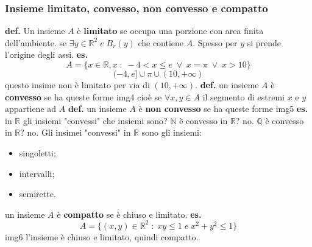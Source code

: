 \subsubsection*{Insieme limitato, convesso, non convesso e compatto}
\textbf{def.} Un insieme $A$ è \textbf{limitato} se occupa una porzione con area finita dell'ambiente.
\newline
se $\exists y \in \mathbb{R}^2 \;e\; B_r(y)$ che contiene $A$. Spesso per $y$ si prende l'origine degli assi.
\newline
\textbf{es.} 
\[
    A = \{x \in \mathbb{R}, x \;:\; -4 < x \leq e \;\lor\; x = \pi \;\lor\; x > 10\}
\]
\[
    (-4,e] \cup {\pi} \cup (10, +\infty)
\]
questo insime non è limitato per via di $(10, +\infty)$.
\newline
\textbf{def.} un insieme $A$ è \textbf{convesso} se ha queste forme
\newline
img4
\newline
cioè se $\forall x, y \in A$ il segmento di estremi $x$ e $y$ appartiene ad $A$
\newline
\textbf{def.} un insieme $A$ è \textbf{non convesso} se ha queste forme
\newline
img5
\newline
\newline
\textbf{es.} in $\mathbb{R}$ gli insiemi "convessi" che insiemi sono?
\newline $\mathbb{N}$ è convesso in $\mathbb{R}$? no.
\newline $\mathbb{Q}$ è convesso in $\mathbb{R}$? no.
\newline
Gli insimei "convessi" in $\mathbb{R}$ sono gli insiemi:
\begin{itemize}
    \item singoletti;
    \item intervalli;
    \item semirette.
\end{itemize}
un insieme $A$ è \textbf{compatto} se è chiuso e limitato.
\newline
\textbf{es.} 
\[
    A =\{ (x,y) \in \mathbb{R}^2 \;:\; xy \leq1 \;e\; x^2+y^2 \leq 1 \}
\]
img6
\newline
l'insieme è chiuso e limitato, quindi compatto.
\newline
\newline
\newline
